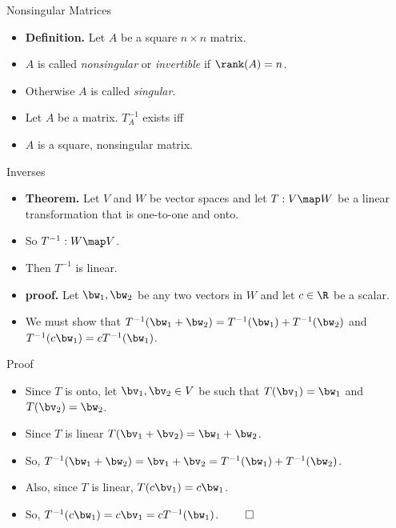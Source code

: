\documentclass{beamer}
\begin{document}
\begin{frame}{Nonsingular Matrices}

\begin{itemize}
\item \textbf{Definition.} Let $A$ be a square $n\times n$ matrix.
\item $A$ is called \emph{nonsingular} or \emph{invertible} if $\rank(A)=n$.
\item Otherwise $A$ is called \emph{singular}.
\item Let $A$ be a matrix. $T_A^{-1}$ exists iff
\item $A$ is a square, nonsingular matrix.
\end{itemize}
\end{frame}


\begin{frame}{Inverses}

\begin{itemize}
\item \textbf{Theorem.} Let $V$ and $W$ be vector spaces and let
$T:V\map W$ be a linear transformation that is one-to-one and onto.
\item So $T^{-1}:W\map V$.
\item Then $T^{-1}$ is linear.
\item \textbf{proof.} Let $\bw_1,\bw_2$ be any two vectors in $W$ and let
$c\in\R$ be a scalar.
\item We must show that $T^{-1}(\bw_1+\bw_2) = T^{-1}(\bw_1) + T^{-1}(\bw_2)$
and $T^{-1}(c\bw_1) = cT^{-1}(\bw_1)$.
\end{itemize}
\end{frame}


\begin{frame}{Proof}

\begin{itemize}
\item Since $T$ is onto, let $\bv_1,\bv_2\in V$ be such that $T(\bv_1)=\bw_1$
and $T(\bv_2)=\bw_2$.
\item Since $T$ is linear $T(\bv_1+\bv_2)=\bw_1 + \bw_2$.
\item So, $T^{-1}(\bw_1+\bw_2) = \bv_1+\bv_2= T^{-1}(\bw_1) + T^{-1}(\bw_2)$.
\item Also, since $T$ is linear, $T(c\bv_1) = c\bw_1$.
\item So, $T^{-1}(c\bw_1) = c\bv_1 = cT^{-1}(\bw_1)$. $\qed$
\end{itemize}
\end{frame}
\end{document}

